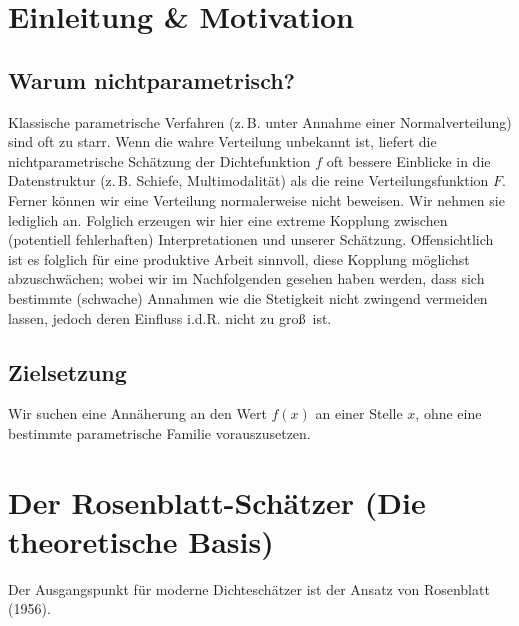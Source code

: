 \documentclass[a4paper, 11pt]{scrartcl}
\newif\ifshowtext
\begin{document}
\maketitle

\ifshowtext
\tableofcontents
\fi


\section{Einleitung \& Motivation}
		
\subsection*{Warum nichtparametrisch?}
	Klassische parametrische Verfahren (z.\,B. unter Annahme einer Normalverteilung) sind oft zu starr. Wenn die wahre Verteilung unbekannt ist, liefert die nichtparametrische Schätzung der Dichtefunktion $f$ oft bessere Einblicke in die Datenstruktur (z.\,B. Schiefe, Multimodalität) als die reine Verteilungsfunktion $F$.
	\\
	Ferner k\"onnen wir eine Verteilung normalerweise nicht beweisen. Wir nehmen sie lediglich an. Folglich erzeugen wir hier eine extreme Kopplung zwischen (potentiell fehlerhaften) Interpretationen und unserer Sch\"atzung. Offensichtlich ist es folglich f\"ur eine produktive Arbeit sinnvoll, diese Kopplung m\"oglichst abzuschw\"achen; wobei wir im Nachfolgenden gesehen haben werden, dass sich bestimmte (schwache) Annahmen wie die Stetigkeit nicht zwingend vermeiden lassen, jedoch deren Einfluss i.d.R. nicht zu gro\ss\ ist.
		
\subsection*{Zielsetzung}
Wir suchen eine Annäherung an den Wert $f(x)$ an einer Stelle $x$, ohne eine bestimmte parametrische Familie vorauszusetzen.
	
\section{Der Rosenblatt-Schätzer (Die theoretische Basis)}
Der Ausgangspunkt für moderne Dichteschätzer ist der Ansatz von Rosenblatt (1956).
	
\end{document}
